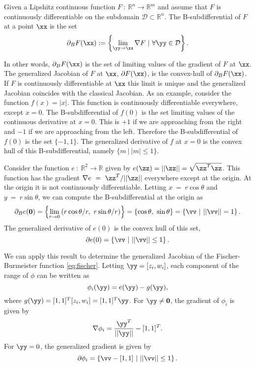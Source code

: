 \begin{definition}
	Given a Lipshitz continuous function $F~:~\mathbb{R}^n\to\mathbb{R}^m$ and assume that $F$ is continuously differentiable on the subdomain $\mathcal{D}\subset\mathbb{R}^n$. The B-subdifferential of $F$ at a point $\xx$ is the set
\[ \partial_B F(\xx) := \left\{\lim\limits_{\yy\to\xx} \nabla F ~| ~ \forall \yy\in\mathcal{D}\right\}.\]
\end{definition}

In other words, $\partial_B F(\xx)$ is the set of limiting values of the gradient of $F$ at $\xx$. The generalized Jacobian of $F$ at $\xx$, $\partial F(\xx)$, is the convex-hull of $\partial_B F(\xx)$.  If $F$ is continuously differentiable at $\xx$ this limit is unique and the generalized Jacobian coincides with the classical Jacobian. As an example, consider the function $f(x) = |x|$. This function is continuously differentiable everywhere, except $x=0$. The B-subdifferential of $f(0)$ is the set limiting values of the continuous derivative at $x=0$. This is $+1$ if we are approaching from the right and $-1$ if we are approaching from the left. Therefore the B-subdifferential of $f(0)$ is the set $\{-1, 1\}$. The generalized derivative of $f$ at $x=0$ is the convex hull of this B-subdifferential, namely $\{m~|~|m| \leq 1\}$.

Consider the function $e~:~\mathbb{R}^2\to\mathbb{R}$ given by  $e(\zz) = ||\zz|| = \sqrt{\zz^T \zz}$. This function has the gradient $\nabla e~=~\zz^T/||\zz||$ everywhere except at the origin. At the origin it is not continuously differentiable. Letting $x~=~r\cos\theta$ and $y~=~r\sin\theta$, we can compute the B-subdifferential at the origin as
\[ \partial_B e(\mathbf{0}) = \left\{\lim\limits_{r\to 0} \left(r\cos\theta/r, ~r\sin\theta/r\right)\right\} = \left\{\cos\theta, ~\sin\theta\right\} = \left\{\vv ~|~||\vv|| = 1\right\}.\]
The generalized derivative of $e(0)$ is the convex hull of this set,
\[ \partial e(0) = \left\{ \vv ~|~||\vv||\leq 1\right\}.\]

We can apply this result to determine the generalized Jacobian of the Fischer-Burmeister function \eqref{eq:fischer}. Letting $\yy = [z_i, w_i]$, each component of the range of $\phi$ can be written as
\[ \phi_i(\yy) = e(\yy) - g(\yy),\]
where $g(\yy) = [1,1]^T [z_i, w_i] = [1,1]^T \yy$. For $\yy\ne \mathbf{0}$, the gradient of $\phi_i$ is given by
\[ \nabla\phi_i = \frac{\yy^T}{||\yy||} - [1,1]^T.\] 
For $\yy=0$, the generalized gradient is given by
\[ \partial \phi_i = \left\{ \vv - [1,1]~|~||\vv||\leq 1\right\}.\]

